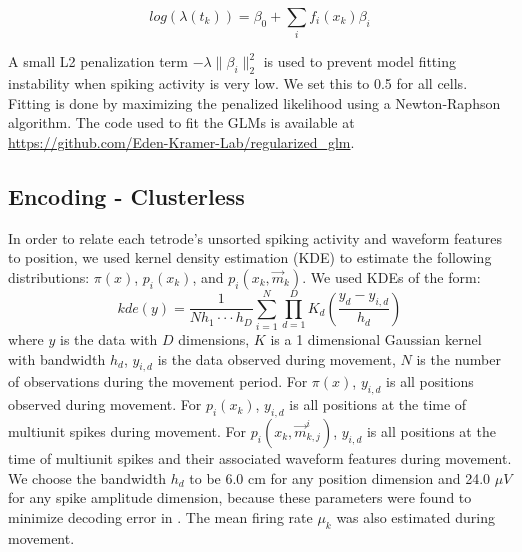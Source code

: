 \documentclass[9pt,lineno]{elife}
\begin{document}
$$log(\lambda(t_k)) = \beta_{0} + \sum_{i} f_{i}(x_k)\beta_{i}$$

A small L2 penalization term $-\lambda\|\beta_{i}\|_{2}^{2}$ is used to prevent model fitting instability when spiking activity is very low. We set this to 0.5 for all cells. Fitting is done by maximizing the penalized likelihood using a Newton-Raphson algorithm. The code used to fit the GLMs is available at \url{https://github.com/Eden-Kramer-Lab/regularized_glm}.

\subsection*{Encoding - Clusterless}
In order to relate each tetrode's unsorted spiking activity and waveform features to position, we used kernel density estimation (KDE) to estimate the following distributions: $\pi(x)$, $p_{i}(x_k)$, and $p_{i}(x_k, \vec{m}_k)$. We used KDEs of the form: 
$$
kde(y) = \frac{1}{N h_1\cdot\cdot\cdot h_D} \sum^{N}_{i=1} \prod^{D}_{d=1} K_{d}\left(\frac{y_d - y_{i,d}}{h_d}\right)
$$
where $y$ is the data with $D$ dimensions, $K$ is a 1 dimensional Gaussian kernel with bandwidth $h_d$, $y_{i, d}$ is the data observed during movement, $N$ is the number of observations during the movement period. For $\pi(x)$, $y_{i, d}$ is all positions observed during movement. For $p_{i}(x_k)$, $y_{i, d}$ is all positions at the time of multiunit spikes during movement. For $p_{i}(x_k, \vec{m}^i_{k,j})$, $y_{i, d}$ is all positions at the time of multiunit spikes and their associated waveform features during movement. We choose the bandwidth $h_d$ to be 6.0 cm for any position dimension and 24.0 $\mu V$ for any spike amplitude dimension, because these parameters were found to minimize decoding error in \cite{KloostermanBayesiandecodingusing2014}. The mean firing rate $\mu_k$ was also estimated during movement.
\end{document}
